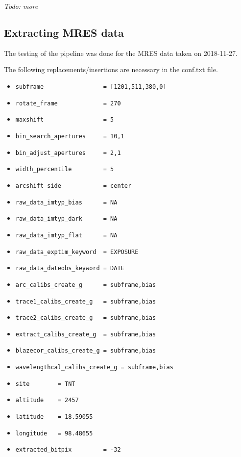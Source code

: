 \documentclass[10pt,a4paper]{article}
\begin{document}
\textit{Todo: more}

\subsection{Extracting MRES data}

The testing of the pipeline was done for the MRES data taken on 2018-11-27.

\noindent The following replacements/insertions are necessary in the conf.txt file. 
\begin{itemize}\small\setlength\itemsep{-0.1cm}
  \item \verb|subframe                 = [1201,511,380,0]|
  \item \verb|rotate_frame             = 270|
  \item \verb|maxshift                 = 5|
  \item \verb|bin_search_apertures     = 10,1|
  \item \verb|bin_adjust_apertures     = 2,1|
  \item \verb|width_percentile         = 5|
  \item \verb|arcshift_side            = center|
  \item \verb|raw_data_imtyp_bias      = NA|
  \item \verb|raw_data_imtyp_dark      = NA|
  \item \verb|raw_data_imtyp_flat      = NA|
  \item \verb|raw_data_exptim_keyword  = EXPOSURE|
  \item \verb|raw_data_dateobs_keyword = DATE|
  \item \verb|arc_calibs_create_g      = subframe,bias|
  \item \verb|trace1_calibs_create_g   = subframe,bias|
  \item \verb|trace2_calibs_create_g   = subframe,bias|
  \item \verb|extract_calibs_create_g  = subframe,bias|
  \item \verb|blazecor_calibs_create_g = subframe,bias|
  \item \verb|wavelengthcal_calibs_create_g = subframe,bias|
  \item \verb|site        = TNT|
  \item \verb|altitude    = 2457|
  \item \verb|latitude    = 18.59055|
  \item \verb|longitude   = 98.48655|
  \item \verb|extracted_bitpix         = -32|
\end{itemize}
\end{document}
